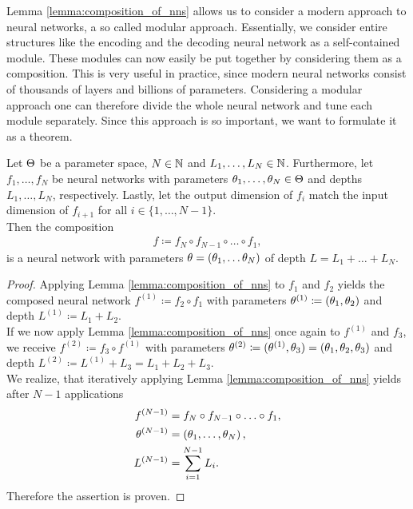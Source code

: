 Lemma \ref{lemma:composition_of_nns} allows us to consider a modern approach to neural networks, a so called modular approach. Essentially, we consider entire structures like the encoding and the decoding neural network as a self-contained module. These modules can now easily be put together by considering them as a composition. This is very useful in practice, since modern neural networks consist of thousands of layers and billions of parameters. Considering a modular approach one can therefore divide the whole neural network and tune each module separately. Since this approach is so important, we want to formulate it as a theorem.


\begin{theorem}\label{theorem:composition_of_nn}
Let $\operatorname{\Theta}$ be a parameter space, $N\in \operatorname{\mathbb{N}}$ and $L_1,\ldots,L_N\in \operatorname{\mathbb{N}}$. Furthermore, let $f_1,\ldots,f_N$ be neural networks with parameters $\theta_1,\ldots,\theta_N\in\operatorname{\Theta}$ and depths $L_1,\ldots,L_N$, respectively. Lastly, let the output dimension of $f_i$ match the input dimension of $f_{i+1}$ for all $i\in\{1,\ldots,N-1\}$.\\
Then the composition
\begin{align*}
f \coloneqq f_{N} \circ f_{N-1} \circ \ldots \circ f_1,
\end{align*}
is a neural network with parameters $\theta = (\theta_1,\ldots\theta_N)$ of depth $L = L_1 + \ldots + L_N$.
\end{theorem}


\begin{proof}
Applying Lemma \ref{lemma:composition_of_nns} to $f_1$ and $f_2$ yields the composed neural network $f^{(1)} \coloneqq f_2 \circ f_1$ with parameters $\theta^{(1)} \coloneqq (\theta_1, \theta_2)$ and depth $L^{(1)}\coloneqq L_1 + L_2$.\\
If we now apply Lemma \ref{lemma:composition_of_nns} once again to $f^{(1)}$ and $f_3$, we receive $f^{(2)} \coloneqq f_3 \circ f^{(1)}$ with parameters $\theta^{(2)} \coloneqq (\theta^{(1)}, \theta_3) = (\theta_1, \theta_2, \theta_3)$ and depth $L^{(2)}\coloneqq L^{(1)} + L_3 = L_1 + L_2 + L_3$.\\
We realize, that iteratively applying Lemma \ref{lemma:composition_of_nns} yields  after $N-1$ applications
\begin{align*}
f^{(N-1)} &= f_{N} \circ f_{N-1} \circ \ldots \circ f_1,\\
\theta^{(N-1)}&= \left(\theta_1, \ldots, \theta_N \right),\\
L^{(N-1)} &= \sum_{i=1}^{N-1} L_i.
\end{align*}
Therefore the assertion is proven.
\end{proof}

